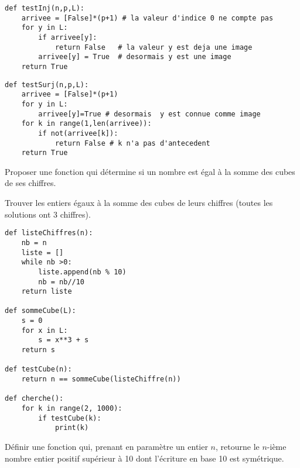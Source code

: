 \begin{Answer}
\begin{lstlisting}
def testInj(n,p,L):
    arrivee = [False]*(p+1) # la valeur d'indice 0 ne compte pas
    for y in L:
        if arrivee[y]:
            return False   # la valeur y est deja une image
        arrivee[y] = True  # desormais y est une image
    return True
\end{lstlisting}
    
\begin{lstlisting}
def testSurj(n,p,L):
    arrivee = [False]*(p+1)
    for y in L:
        arrivee[y]=True # desormais  y est connue comme image
    for k in range(1,len(arrivee)):
        if not(arrivee[k]):
            return False # k n'a pas d'antecedent
    return True
\end{lstlisting}
\newpage
\end{Answer}
\begin{Exercise}[label = exo:ch3]
Proposer une fonction qui détermine si un nombre est égal à la somme des cubes de ses chiffres. 

Trouver les entiers égaux à la somme des cubes de leurs chiffres (toutes les solutions ont 3 chiffres).
\end{Exercise}
\begin{Answer}
\begin{lstlisting}
def listeChiffres(n):
    nb = n 
    liste = []
    while nb >0:
        liste.append(nb % 10)
        nb = nb//10
    return liste

def sommeCube(L):
    s = 0
    for x in L:
        s = x**3 + s
    return s

def testCube(n):
    return n == sommeCube(listeChiffre(n))

def cherche():
    for k in range(2, 1000):
        if testCube(k):
            print(k)
\end{lstlisting}
\end{Answer}
\begin{Exercise}
Définir une fonction qui, prenant en paramètre un entier $n$, retourne le $n$-ième nombre entier positif supérieur à 10 dont l'écriture en base 10 est symétrique.
\end{Exercise}
